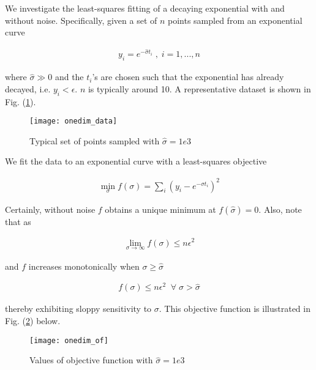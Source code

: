 \documentclass[12pt]{article}
\begin{document}
\title{}
\author{}
\date{}
\maketitle

We investigate the least-squares fitting of a decaying exponential with and without noise. Specifically, given a set of $n$ points sampled from an exponential curve

\begin{align*}
  y_i = e^{-\hat{\sigma} t_i} \;, \; i=1,...,n
\end{align*}

where $\hat{\sigma} \gg 0$ and the $t_i$'s are chosen such that the exponential has already decayed, i.e. $y_i < \epsilon$. $n$ is typically around 10. A representative dataset is shown in Fig. (\ref{data}). 

\begin{figure}[h!]
  \texttt{[image: onedim\_data]}
  \caption{Typical set of points sampled with $\hat{\sigma} = 1e3$}
  \label{data}
\end{figure}


We fit the data to an exponential curve with a least-squares objective

\begin{align*}
  \min\limits_\sigma f(\sigma) =  \sum\limits_i (y_i - e^{-\sigma t_i})^2
\end{align*}

Certainly, without noise $f$ obtains a unique minimum at $f(\hat{\sigma})= 0$. Also, note that as

\begin{align*}
  \lim\limits_{\sigma \rightarrow \infty} f(\sigma) \leq n \epsilon^2
\end{align*}

and $f$ increases monotonically when $\sigma \geq \hat{\sigma}$

\begin{align*}
  f(\sigma) \leq n \epsilon^2 \; \; \forall \; \sigma > \hat{\sigma}
\end{align*}

thereby exhibiting sloppy sensitivity to $\sigma$. This objective function is illustrated in Fig. (\ref{of}) below.

\begin{figure}[h!]
  \texttt{[image: onedim\_of]}
  \caption{Values of objective function with $\hat{\sigma} = 1e3$}
  \label{of}
\end{figure}
\end{document}

